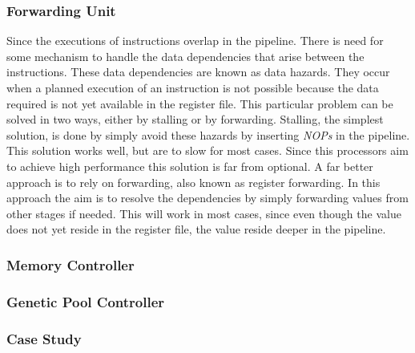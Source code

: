 \subsubsection{Forwarding Unit} \label{fpga:fitness:sss:forwarding_unit}
Since the executions of instructions overlap in the pipeline.
There is need for some mechanism to handle the data dependencies that arise between the instructions.
These data dependencies are known as data hazards.
They occur when a planned execution of an instruction is not possible because the data required is not yet available in the register file.
This particular problem can be solved in two ways, either by stalling or by forwarding.
Stalling, the simplest solution, is done by simply avoid these hazards by inserting \emph{NOPs} in the pipeline.
This solution works well, but are to slow for most cases.
Since this processors aim to achieve high performance this solution is far from optional.
A far better approach is to rely on forwarding, also known as register forwarding.
In this approach the aim is to resolve the dependencies by simply forwarding values from other stages if needed.
This will work in most cases, since even though the value does not yet reside in the register file, the value reside deeper in the pipeline.






\subsubsection{Memory Controller} \label{fpga:fitness:sss:memory_controller}

\subsubsection{Genetic Pool Controller} \label{fpga:fitness:sss:genetic_pool_controller}

\subsubsection{Case Study} \label{fpga:fitness:sss:case_study}




